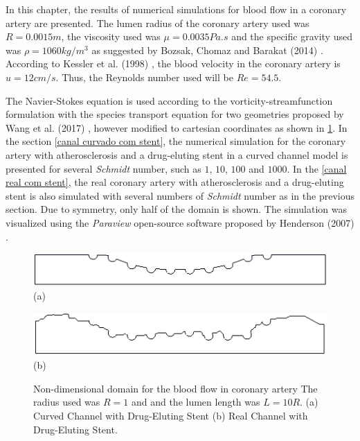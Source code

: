 In this chapter, the results of numerical simulations for 
blood flow in a coronary artery are presented. 
The lumen radius of the coronary artery used was $R=0.0015m$, 
the viscosity used was $\mu=0.0035Pa.s$ and the specific gravity used was
$\rho=1060kg/m^3$ as suggested by Bozsak, Chomaz and Barakat (2014)
 \cite{bozsak2014}. According to Kessler et al. (1998) 
\cite{kessler1998}, the blood velocity in the coronary artery 
is $u=12cm/s$. Thus, the Reynolds number used will be 
$Re=54.5$. 

\medskip
The Navier-Stokes equation is used according to the 
vorticity-streamfunction formulation with 
the species transport equation for two geometries proposed 
by Wang et al. (2017) \cite{wang2017}, however modified to 
cartesian coordinates as shown in \ref{coronary artery geo}. 
In the section \ref{canal curvado com stent}, the numerical 
simulation for the coronary artery with atherosclerosis 
and a drug-eluting stent in a curved channel model 
is presented for several 
\textit{Schmidt} number, such as $1$, $10$, $100$ and $1000$. 
In the \ref{canal real com stent}, the real coronary 
artery with atherosclerosis and a drug-eluting stent is also 
simulated with several numbers of \textit{Schmidt} number 
as in the previous section.
Due to symmetry, only half of the domain is shown. 
The simulation was visualized using the \textit{Paraview} open-source 
software proposed by Henderson (2007) \cite{paraview}.


\begin{figure}[H]
     \centering
     \begin{minipage}{.45\linewidth}
      \centering
      \includegraphics[scale=0.22]{./02_chaps/cap_solution/figure/CurvedStrut.png}\\
      (a)
     \end{minipage}%
     \begin{minipage}{.45\linewidth}
      \centering
      \includegraphics[scale=0.22]{./02_chaps/cap_solution/figure/RealStrut.png}\\
      (b)
     \end{minipage}
     \medskip
     \caption{Non-dimensional domain for the blood flow in coronary artery
     The radius used was $R=1$ and and the lumen length was $L=10R$.
     (a) Curved Channel with Drug-Eluting Stent
     (b) Real Channel with Drug-Eluting Stent.}
     \label{coronary artery geo}
\end{figure}
